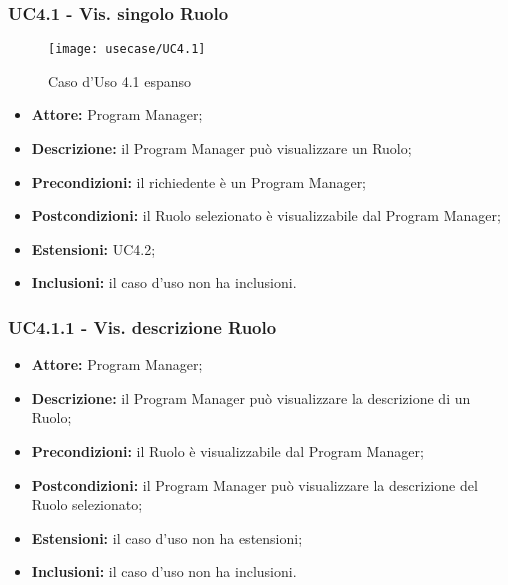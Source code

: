 \subsubsection*{UC4.1 - Vis. singolo Ruolo}
\begin{figure}[H] 
    \centering 
    \texttt{[image: usecase/UC4.1]} 
    \caption{Caso d'Uso 4.1 espanso}
\end{figure}
\begin{itemize}[label=$\circ$]
\item \textbf{Attore:} Program Manager;
\item \textbf{Descrizione:} il Program Manager può visualizzare un Ruolo;
\item \textbf{Precondizioni:} il richiedente è un Program Manager;
\item \textbf{Postcondizioni:} il Ruolo selezionato è visualizzabile dal Program Manager;
\item \textbf{Estensioni:}  UC4.2;
\item \textbf{Inclusioni:} il caso d'uso non ha inclusioni.
\end{itemize}

\subsubsection*{UC4.1.1 - Vis. descrizione Ruolo}
\begin{itemize}[label=$\circ$]
\item \textbf{Attore:} Program Manager;
\item \textbf{Descrizione:} il Program Manager può visualizzare la descrizione di un Ruolo;
\item \textbf{Precondizioni:}  il Ruolo è visualizzabile dal Program Manager;
\item \textbf{Postcondizioni:} il Program Manager può visualizzare la descrizione del Ruolo selezionato;
\item \textbf{Estensioni:} il caso d'uso non ha estensioni;
\item \textbf{Inclusioni:} il caso d'uso non ha inclusioni.
\end{itemize}


